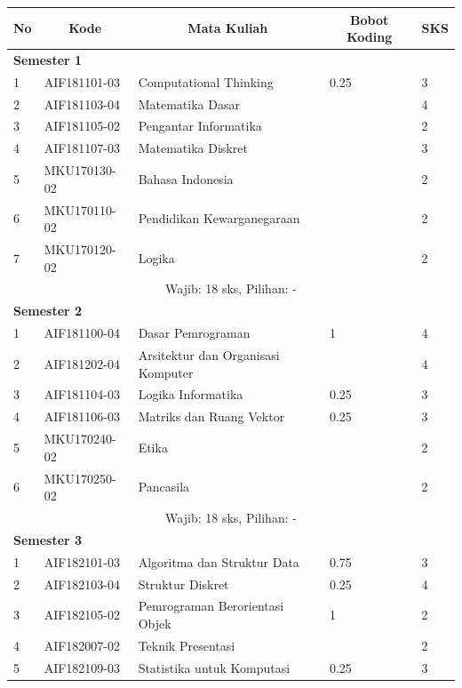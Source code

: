 \documentclass[a4paper,twoside]{article}
\begin{document}
\begin{enumerate}
\begin{enumerate}
\begin{table}[H]
\begin{tabular}{|p{0.5cm}|p{2.85cm}|p{4.95cm}|p{2.7cm}|p{2.7cm}|}
					\hline
					\multicolumn{1}{|c|}{\textbf{No}} & \multicolumn{1}{c|}{\textbf{Kode}} & \multicolumn{1}{c|}{\textbf{Mata Kuliah}} & \multicolumn{1}{c|}{\textbf{Bobot Koding}} & \multicolumn{1}{c|}{\textbf{SKS}} \\ \hline
					\multicolumn{5}{|l|}{\textbf{Semester 1}} \\ \hline
					1 &	AIF181101-03 &	Computational Thinking &	0.25 &	3   \\ \hline
					2 &	AIF181103-04 &	Matematika Dasar &	&	4  \\ \hline
					3 &	AIF181105-02 &	Pengantar Informatika &  & 2  \\ \hline
					4	& AIF181107-03 &	Matematika Diskret &	&	3  \\ \hline
					5	& MKU170130-02 &	Bahasa Indonesia &	&	2  \\ \hline
					6	& MKU170110-02 &	Pendidikan Kewarganegaraan &	&	2  \\ \hline
					7	& MKU170120-02 &	Logika &	&	2  \\ \hline
					\multicolumn{5}{|c|}{Wajib: 18 sks, Pilihan: -} \\ \hline
					\multicolumn{5}{|l|}{\textbf{Semester 2}} \\ \hline
					1 &	AIF181100-04 &	Dasar Pemrograman &	1 &	4 \\ \hline
					2 &	AIF181202-04 &	Arsitektur dan Organisasi Komputer & &	4  \\ \hline
					3 &	AIF181104-03 &	Logika Informatika &	0.25 &	3  \\ \hline
					4 &	AIF181106-03 &	Matriks dan Ruang Vektor &	0.25 &	3  \\ \hline
					5 &	MKU170240-02 &	Etika	& &	2  \\ \hline
					6 &	MKU170250-02 &	Pancasila & &	2  \\ \hline
					\multicolumn{5}{|c|}{Wajib: 18 sks, Pilihan: - }\\ \hline
					\multicolumn{5}{|l|}{\textbf{Semester 3}} \\ \hline
					1 &	AIF182101-03 &	Algoritma dan Struktur Data &	0.75 &	3  \\ \hline
					2 &	AIF182103-04 &	Struktur Diskret &	0.25 &	4  \\ \hline
					3 &	AIF182105-02 &	Pemrograman Berorientasi Objek &	1 &	2   \\ \hline
					4 &	AIF182007-02 &	Teknik Presentasi &  &	2  \\ \hline
					5 &	AIF182109-03 &	Statistika untuk Komputasi &	0.25 &	3  \\ \hline

\end{tabular}
\end{table}
\end{enumerate}
\end{enumerate}
\end{document}

